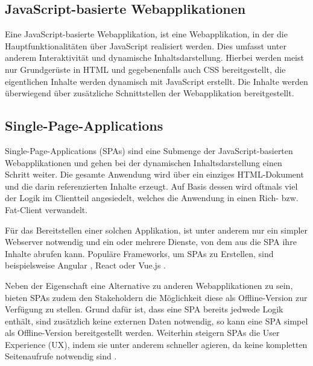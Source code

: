


\subsection{JavaScript-basierte Webapplikationen}

Eine JavaScript-basierte Webapplikation, ist eine Webapplikation, in der die Hauptfunktionalitäten über JavaScript realisiert werden. Dies umfasst unter anderem Interaktivität und dynamische Inhaltsdarstellung. Hierbei werden meist nur Grundgerüste in HTML und gegebenenfalls auch CSS bereitgestellt, die eigentlichen Inhalte werden dynamisch mit JavaScript erstellt. Die Inhalte werden überwiegend über zusätzliche Schnittstellen der Webapplikation bereitgestellt.

\subsection{Single-Page-Applications}
\label{subsec:singe-page-applications}

Single-Page-Applications (SPAs) sind eine Submenge der JavaScript-basierten Webapplikationen und gehen bei der dynamischen Inhaltsdarstellung einen Schritt weiter. Die gesamte Anwendung wird über ein einziges HTML-Dokument und die darin referenzierten Inhalte erzeugt. Auf Basis dessen wird oftmals viel der Logik im Clientteil angesiedelt, welches die Anwendung in einen Rich- bzw. Fat-Client verwandelt.

Für das Bereitstellen einer solchen Applikation, ist unter anderem nur ein simpler Webserver notwendig und ein oder mehrere Dienste, von dem aus die SPA ihre Inhalte abrufen kann. Populäre Frameworks, um SPAs zu Erstellen, sind beispielsweise Angular \cite{AngularHomepage}, React \cite{ReactHomepage} oder Vue.js \cite{VueJSHomepage}.

Neben der Eigenschaft eine Alternative zu anderen Webapplikationen zu sein, bieten SPAs zudem den Stakeholdern die Möglichkeit diese als Offline-Version zur Verfügung zu stellen. Grund dafür ist, dass eine SPA bereits jedwede Logik enthält, sind zusätzlich keine externen Daten notwendig, so kann eine SPA simpel als Offline-Version bereitgestellt werden. Weiterhin steigern SPAs die User Experience (UX), indem sie unter anderem schneller agieren, da keine kompletten Seitenaufrufe notwendig sind \cite{ImprovementOfAcedemicServiceBasedOnSPA}.

